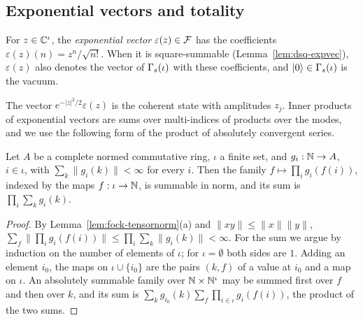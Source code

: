 \begin{veteenv}
\subsection{Exponential vectors and totality}\label{sec:dsq-expvec}

\begin{definition}\label{def:dsq-expvec}
For $z\in\mathbb C^\iota$, the \emph{exponential vector} $\varepsilon(z)\in\mathcal F$ has the coefficients
$\varepsilon(z)(n)=z^n/\sqrt{n!}$. When it is square-summable (Lemma~\ref{lem:dsq-expvec}), $\varepsilon(z)$ also
denotes the vector of $\Gamma_s(\iota)$ with these coefficients, and $\lvert 0\rangle\in\Gamma_s(\iota)$ is the vacuum.
\end{definition}

The vector $e^{-\lvert z\rvert^2/2}\varepsilon(z)$ is the coherent state with amplitudes $z_j$. Inner products of
exponential vectors are sums over multi-indices of products over the modes, and we use the following form of the
product of absolutely convergent series.

\begin{lemma}\label{lem:dsq-prodseries}
Let $A$ be a complete normed commutative ring, $\iota$ a finite set, and $g_i:\mathbb N\to A$, $i\in\iota$, with
$\sum_k\lVert g_i(k)\rVert<\infty$ for every $i$. Then the family $f\mapsto\prod_ig_i(f(i))$, indexed by the maps
$f:\iota\to\mathbb N$, is summable in norm, and its sum is $\prod_i\sum_kg_i(k)$.
\end{lemma}

\begin{proof}
By Lemma~\ref{lem:fock-tensornorm}(a) and $\lVert xy\rVert\le\lVert x\rVert\lVert y\rVert$,
$\sum_f\lVert\prod_ig_i(f(i))\rVert\le\prod_i\sum_k\lVert g_i(k)\rVert<\infty$. For the sum we argue by induction on the
number of elements of $\iota$; for $\iota=\emptyset$ both sides are $1$. Adding an element $i_0$, the maps on
$\iota\cup\{i_0\}$ are the pairs $(k,f)$ of a value at $i_0$ and a map on $\iota$. An absolutely summable family over
$\mathbb N\times\mathbb N^\iota$ may be summed first over $f$ and then over $k$, and its sum is
$\sum_kg_{i_0}(k)\sum_f\prod_{i\in\iota}g_i(f(i))$, the product of the two sums.
\end{proof}


\end{veteenv}
